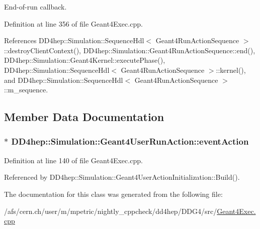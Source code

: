 End-\/of-\/run callback. 

Definition at line 356 of file Geant4Exec.cpp.

References DD4hep::Simulation::SequenceHdl$<$ Geant4RunActionSequence $>$::destroyClientContext(), DD4hep::Simulation::Geant4RunActionSequence::end(), DD4hep::Simulation::Geant4Kernel::executePhase(), DD4hep::Simulation::SequenceHdl$<$ Geant4RunActionSequence $>$::kernel(), and DD4hep::Simulation::SequenceHdl$<$ Geant4RunActionSequence $>$::m\_\-sequence.

\subsection{Member Data Documentation}
\hypertarget{class_d_d4hep_1_1_simulation_1_1_geant4_user_run_action_a6726ebc3d952df848fc4e8288d3bb6c0}{
\subsubsection[{eventAction}]{$\ast$ {\bf DD4hep::Simulation::Geant4UserRunAction::eventAction}}}
\label{class_d_d4hep_1_1_simulation_1_1_geant4_user_run_action_a6726ebc3d952df848fc4e8288d3bb6c0}


Definition at line 140 of file Geant4Exec.cpp.

Referenced by DD4hep::Simulation::Geant4UserActionInitialization::Build().

The documentation for this class was generated from the following file:\begin{DoxyCompactItemize}
\item 
/afs/cern.ch/user/m/mpetric/nightly\_\-cppcheck/dd4hep/DDG4/src/\hyperlink{_geant4_exec_8cpp}{Geant4Exec.cpp}\end{DoxyCompactItemize}
